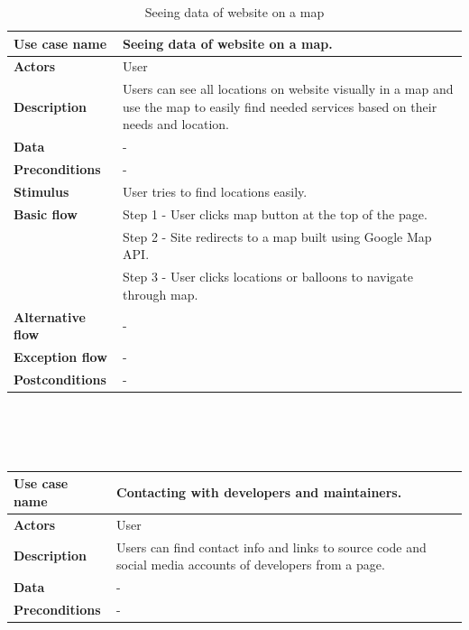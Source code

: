 \begin{center}
\begin{table}[H]
\begin{tabular}{| m{3cm}| m{10cm} |}
            \hline
            \textbf{Use case name} & Seeing data of website on a map.  \\
            \hline
            \textbf{Actors} & User\\
            \hline
            \textbf{Description} & Users can see all locations on website visually in a map and use the map to easily find needed services based on their needs and location.\\
            \hline
            \textbf{Data} & - \\
            \hline
            \textbf{Preconditions} &  -\\
            \hline
            \textbf{Stimulus} & User tries to find locations easily. \\
            \hline
            \textbf{Basic flow} & Step 1 - User clicks map button at the top of the page.\\
                                & Step 2 - Site redirects to a map built using Google Map API.\\
                                & Step 3 - User clicks locations or balloons to navigate through map.\\
            \hline
            \textbf{Alternative flow} & - \\
            \hline
            \textbf{Exception flow} &  -\\
            \hline
            \textbf{Postconditions} & -\\
            \hline
        \end{tabular}
        \caption[Seeing data of website on a map]{Seeing data of website on a map}
    \end{table}
    ~\\~\\~\\
    \begin{table}[H]
        \begin{tabular}{| m{3cm}| m{10cm} |}
            \hline
            \textbf{Use case name} & Contacting with developers and maintainers.  \\
            \hline
            \textbf{Actors} & User\\
            \hline
            \textbf{Description} & Users can find contact info and links to source code and social media accounts of developers from a page.\\
            \hline
            \textbf{Data} & - \\
            \hline
            \textbf{Preconditions} &  -\\

\end{tabular}
\end{table}
\end{center}
